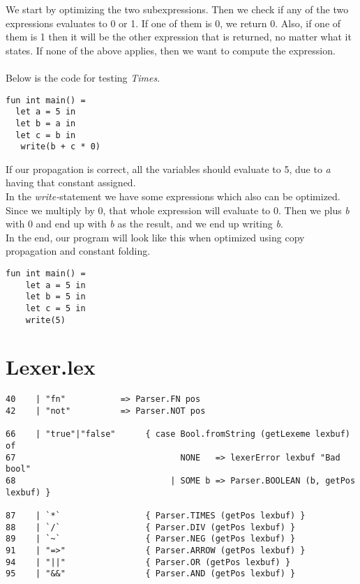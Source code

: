 \documentclass[paper=a4, fontsize=11pt]{scrartcl} %
\numberwithin{equation}{section} %
\numberwithin{figure}{section} %
\numberwithin{table}{section} %
\begin{document}
We start by optimizing the two subexpressions. Then we check if any of the two expressions evaluates to 0 or 1. If one of them is 0, we return 0. Also, if one of them is 1 then it will be the other expression that is returned, no matter what it states. If none of the above applies, then we want to compute the expression.\\\\
Below is the code for testing \textit{Times}. 
\begin{lstlisting}
fun int main() = 
  let a = 5 in
  let b = a in
  let c = b in
   write(b + c * 0)
\end{lstlisting}
If our propagation is correct, all the variables should evaluate to 5, due to \textit{a} having that constant assigned.\\
In the \textit{write-}statement we have some expressions which also can be optimized. Since we multiply by 0, that whole expression will evaluate to 0. Then we plus \textit{b} with 0 and end up with \textit{b} as the result, and we end up writing \textit{b}.\\
In the end, our program will look like this when optimized using copy propagation and constant folding.
\begin{lstlisting}
fun int main() =  
    let a = 5 in    
    let b = 5 in    
    let c = 5 in
    write(5)
\end{lstlisting}

\pagebreak

\appendix

\chapter{Lexer.lex}

\begin{lstlisting}
40	  | "fn"           => Parser.FN pos 
42	  | "not"          => Parser.NOT pos

66	  | "true"|"false"      { case Bool.fromString (getLexeme lexbuf) of 
67	                               NONE   => lexerError lexbuf "Bad bool" 
68	                             | SOME b => Parser.BOOLEAN (b, getPos lexbuf) }

87	  | `*`                 { Parser.TIMES (getPos lexbuf) } 
88	  | `/`                 { Parser.DIV (getPos lexbuf) } 
89	  | `~`                 { Parser.NEG (getPos lexbuf) }
91	  | "=>"                { Parser.ARROW (getPos lexbuf) } 
94	  | "||"                { Parser.OR (getPos lexbuf) } 
95	  | "&&"                { Parser.AND (getPos lexbuf) } 
\end{lstlisting}
\end{document}
